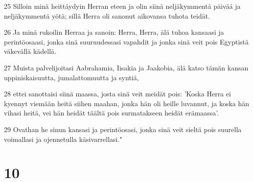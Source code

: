\par 25 Silloin minä heittäydyin Herran eteen ja olin siinä neljäkymmentä päivää ja neljäkymmentä yötä; sillä Herra oli sanonut aikovansa tuhota teidät.
\par 26 Ja minä rukoilin Herraa ja sanoin: Herra, Herra, älä tuhoa kansaasi ja perintöosaasi, jonka sinä suuruudessasi vapahdit ja jonka sinä veit pois Egyptistä väkevällä kädellä.
\par 27 Muista palvelijoitasi Aabrahamia, Iisakia ja Jaakobia, älä katso tämän kansan uppiniskaisuutta, jumalattomuutta ja syntiä,
\par 28 ettei sanottaisi siinä maassa, josta sinä veit meidät pois: 'Koska Herra ei kyennyt viemään heitä siihen maahan, jonka hän oli heille luvannut, ja koska hän vihasi heitä, vei hän heidät täältä pois surmatakseen heidät erämaassa'.
\par 29 Ovathan he sinun kansasi ja perintöosasi, jonka sinä veit sieltä pois suurella voimallasi ja ojennetulla käsivarrellasi."

\chapter{10}

